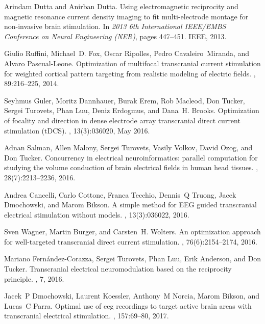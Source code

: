 \begin{thebibliography}{10}
Arindam Dutta and Anirban Dutta.
\newblock Using electromagnetic reciprocity and magnetic resonance current density imaging to fit multi-electrode montage for non-invasive brain stimulation.
\newblock In {\em 2013 6th International IEEE/EMBS Conference on Neural Engineering (NER)}, pages 447--451. IEEE, 2013.

Giulio Ruffini, Michael~D. Fox, Oscar Ripolles, Pedro Cavaleiro~Miranda, and Alvaro Pascual-Leone.
\newblock Optimization of multifocal transcranial current stimulation for weighted cortical pattern targeting from realistic modeling of electric fields.
, 89:216--225, 2014.

Seyhmus Guler, Moritz Dannhauer, Burak Erem, Rob Macleod, Don Tucker, Sergei Turovets, Phan Luu, Deniz Erdogmus, and Dana~H. Brooks.
\newblock Optimization of focality and direction in dense electrode array transcranial direct current stimulation {(tDCS)}.
, 13(3):036020, May 2016.

Adnan Salman, Allen Malony, Sergei Turovets, Vasily Volkov, David Ozog, and Don Tucker.
\newblock Concurrency in electrical neuroinformatics: parallel computation for studying the volume conduction of brain electrical fields in human head tissues.
, 28(7):2213--2236, 2016.

Andrea Cancelli, Carlo Cottone, Franca Tecchio, Dennis~Q Truong, Jacek Dmochowski, and Marom Bikson.
\newblock A simple method for {EEG} guided transcranial electrical stimulation without models.
, 13(3):036022, 2016.

Sven Wagner, Martin Burger, and Carsten~H. Wolters.
\newblock An optimization approach for well-targeted transcranial direct current stimulation.
, 76(6):2154--2174, 2016.

Mariano Fernández-Corazza, Sergei Turovets, Phan Luu, Erik Anderson, and Don Tucker.
\newblock Transcranial electrical neuromodulation based on the reciprocity principle.
, 7, 2016.

Jacek~P Dmochowski, Laurent Koessler, Anthony~M Norcia, Marom Bikson, and Lucas~C Parra.
\newblock Optimal use of eeg recordings to target active brain areas with transcranial electrical stimulation.
, 157:69--80, 2017.


\end{thebibliography}
